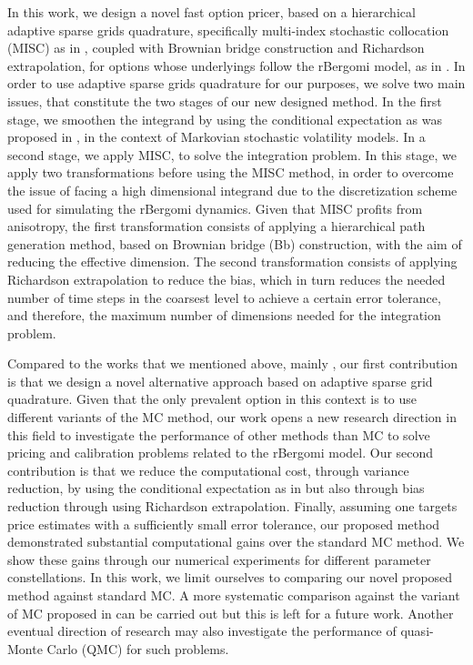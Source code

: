 In this work,  we design a novel fast option pricer,  based on a  hierarchical adaptive sparse grids quadrature, specifically  multi-index stochastic collocation (MISC) as in  \cite{haji2016multi}, coupled with Brownian bridge construction and Richardson extrapolation, for options whose underlyings  follow the rBergomi model, as in \cite{bayer2016pricing}.  In order to use adaptive sparse grids quadrature for our purposes, we  solve two main issues, that constitute the two stages of our new designed method. In the first stage, we smoothen the integrand by using the conditional expectation as was proposed in \cite{romano1997contingent}, in the context of Markovian stochastic volatility  models.   In a second stage, we apply  MISC, to solve the integration problem. In this stage, we apply two transformations before using the MISC method, in order to overcome the issue of facing a high dimensional integrand due to the discretization scheme used for simulating the rBergomi dynamics. Given that MISC profits from anisotropy, the first transformation consists of applying a hierarchical  path generation method, based on Brownian
bridge (Bb) construction, with the aim of reducing the effective dimension. The second transformation consists of applying Richardson extrapolation to reduce the bias, which in turn reduces the needed number of time steps in the coarsest level to achieve a certain error tolerance, and therefore,  the maximum number of dimensions needed for the integration problem.

Compared to the works that we mentioned above, mainly \cite{mccrickerd2017turbocharging}, our first contribution is that we design a novel alternative approach based on adaptive sparse grid quadrature. Given that the only prevalent option in this context is to use different variants of the MC method, our work opens a new  research direction in this field to investigate the performance of other methods than MC to solve pricing and calibration problems related to the rBergomi model. Our second contribution is that we reduce the computational cost, through variance reduction,  by using the conditional expectation as in \cite{mccrickerd2017turbocharging} but also through bias reduction through using Richardson extrapolation. Finally, assuming one targets price estimates with a sufficiently small  error tolerance, our proposed method demonstrated substantial computational gains  over the standard MC method. We show  these gains through our numerical experiments for  different parameter constellations. In this work, we limit ourselves to comparing our novel proposed method against standard MC. A more systematic comparison against the variant of MC proposed in \cite{mccrickerd2017turbocharging}  can be carried out but this is left for a future work. Another eventual direction of research may also investigate the performance of quasi-Monte Carlo (QMC) for such problems.


